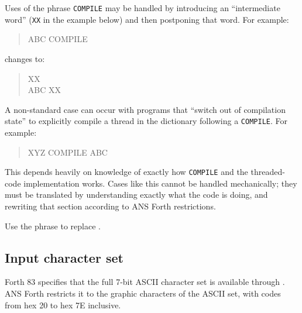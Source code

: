 \begin{description}
	Uses of the phrase \texttt{COMPILE} \word{[COMPILE]}
	 may be handled by introducing an
	``intermediate word'' (\texttt{XX} in the example below) and then
	postponing that word. For example:
	\begin{quote}\ttfamily
		\word{:} ABC COMPILE \word{[COMPILE]}  \word{;}
	\end{quote}
	changes to:
	\begin{quote}\ttfamily
		\word{:} XX   \word{;} \\
		\word{:} ABC  XX \word{;}
	\end{quote}
	A non-standard case can occur with programs that ``switch out of
	compilation state'' to explicitly compile a thread in the
	dictionary following a \texttt{COMPILE}. For example:
	\begin{quote}\ttfamily
		\word{:} XYZ COMPILE \word{[}  ABC \word{,} \word{]} \word{;}
	\end{quote}
	This depends heavily on knowledge of exactly how \texttt{COMPILE}
	and the threaded-code implementation works. Cases like this cannot
	be handled mechanically; they must be translated by understanding
	exactly what the code is doing, and rewriting that section according
	to ANS Forth restrictions.

	Use the phrase  \word{[COMPILE]} to replace
	\word{[COMPILE]} \word{[COMPILE]}.
\end{description}


\subsection{Input character set} %

Forth 83 specifies that the full 7-bit ASCII character set is
available through . ANS Forth restricts it to the graphic
characters of the ASCII set, with codes from hex 20 to hex 7E
inclusive.

